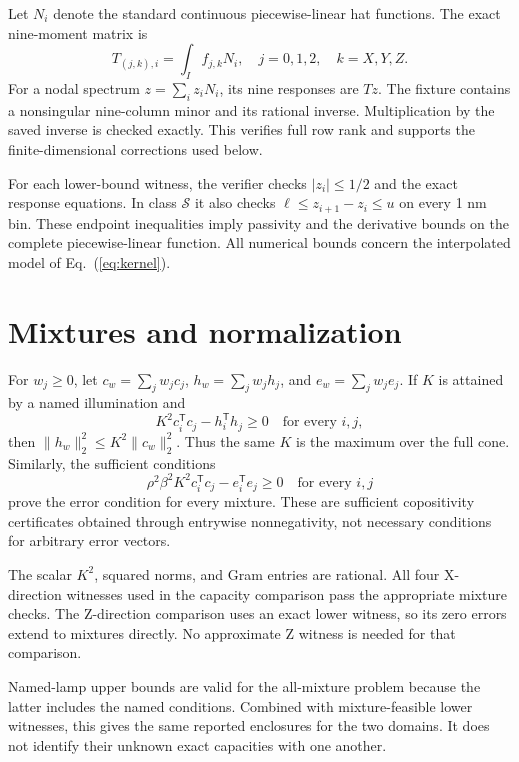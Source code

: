 \documentclass[9pt]{osa-supplemental-document}
\renewcommand{\eqref}[1]{\textup{(\ref{#1})}}
\begin{document}
Let $N_i$ denote the standard continuous piecewise-linear hat functions. The exact nine-moment matrix is
\begin{equation}
 T_{(j,k),i}=\int_I f_{j,k}N_i,
 \quad j=0,1,2,\quad k=X,Y,Z.
\end{equation}
For a nodal spectrum $z=\sum_i z_iN_i$, its nine responses are $Tz$. The fixture contains a nonsingular nine-column minor and its rational inverse. Multiplication by the saved inverse is checked exactly. This verifies full row rank and supports the finite-dimensional corrections used below.

For each lower-bound witness, the verifier checks $|z_i|\leq1/2$ and the exact response equations. In class $\mathcal S$ it also checks $\ell\leq z_{i+1}-z_i\leq u$ on every 1 nm bin. These endpoint inequalities imply passivity and the derivative bounds on the complete piecewise-linear function. All numerical bounds concern the interpolated model of Eq.~\eqref{eq:kernel}.

\section{Mixtures and normalization}
For $w_j\geq0$, let $c_w=\sum_jw_jc_j$, $h_w=\sum_jw_jh_j$, and $e_w=\sum_jw_je_j$. If $K$ is attained by a named illumination and
\begin{equation}
 K^2c_i^{\mathsf T}c_j-h_i^{\mathsf T}h_j\geq0\quad\text{for every }i,j,
\end{equation}
then $\|h_w\|_2^2\leq K^2\|c_w\|_2^2$. Thus the same $K$ is the maximum over the full cone. Similarly, the sufficient conditions
\begin{equation}
 \rho^2\beta^2K^2c_i^{\mathsf T}c_j-e_i^{\mathsf T}e_j\geq0
 \quad\text{for every }i,j
 \label{eq:errorgram}
\end{equation}
prove the error condition for every mixture. These are sufficient copositivity certificates obtained through entrywise nonnegativity, not necessary conditions for arbitrary error vectors.

The scalar $K^2$, squared norms, and Gram entries are rational. All four X-direction witnesses used in the capacity comparison pass the appropriate mixture checks. The Z-direction comparison uses an exact lower witness, so its zero errors extend to mixtures directly. No approximate Z witness is needed for that comparison.

Named-lamp upper bounds are valid for the all-mixture problem because the latter includes the named conditions. Combined with mixture-feasible lower witnesses, this gives the same reported enclosures for the two domains. It does not identify their unknown exact capacities with one another.
\end{document}
